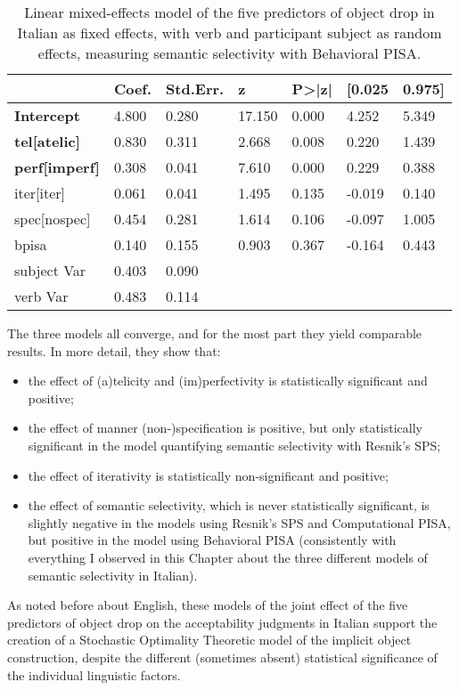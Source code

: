 \begin{table}[H] %
\caption{Linear mixed-effects model of the five predictors of object drop in Italian as fixed effects, with verb and participant subject as random effects, measuring semantic selectivity with Behavioral PISA.}
\begin{tabular}{l|llllll}
                         & Coef. & Std.Err. & z      & P\textgreater{}|z| & {[}0.025 & 0.975{]} \\
\hline                         
\textbf{Intercept}                & 4.800 & 0.280    & 17.150 & 0.000              & 4.252    & 5.349    \\
\textbf{tel{[}atelic{]}}     & 0.830 & 0.311    & 2.668  & 0.008              & 0.220    & 1.439    \\
\textbf{perf{[}imperf{]}} & 0.308 & 0.041    & 7.610  & 0.000              & 0.229    & 0.388    \\
iter{[}iter{]}    & 0.061 & 0.041    & 1.495  & 0.135              & -0.019   & 0.140    \\
spec{[}nospec{]}     & 0.454 & 0.281    & 1.614  & 0.106              & -0.097   & 1.005    \\
bpisa                    & 0.140 & 0.155    & 0.903  & 0.367              & -0.164   & 0.443    \\
subject Var              & 0.403 & 0.090    &        &                    &          &          \\
verb Var                 & 0.483 & 0.114    &        &                    &          &         
\end{tabular}
\end{table}

The three models all converge, and for the most part they yield comparable results. In more detail, they show that:
\begin{itemize}
    \item the effect of (a)telicity and (im)perfectivity is statistically significant and positive;
    \item the effect of manner (non-)specification is positive, but only statistically significant in the model quantifying semantic selectivity with Resnik's SPS;
    \item the effect of iterativity is statistically non-significant and positive;
    \item the effect of semantic selectivity, which is never statistically significant, is slightly negative in the models using Resnik's SPS and Computational PISA, but positive in the model using Behavioral PISA (consistently with everything I observed in this Chapter about the three different models of semantic selectivity in Italian).
\end{itemize}
As noted before about English, these models of the joint effect of the five predictors of object drop on the acceptability judgments in Italian support the creation of a Stochastic Optimality Theoretic model of the implicit object construction, despite the different (sometimes absent) statistical significance of the individual linguistic factors.



